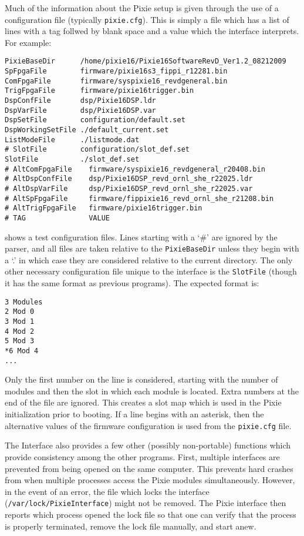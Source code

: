 \documentclass[10pt]{article}
\begin{document}
Much of the information about the Pixie setup is given through the use of a configuration file (typically \texttt{pixie.cfg}). This is simply a file which has a list of lines with a tag follwed by blank space and a value which the interface interprets. For example:
\begin{verbatim}
PixieBaseDir      /home/pixie16/Pixie16SoftwareRevD_Ver1.2_08212009
SpFpgaFile        firmware/pixie16s3_fippi_r12281.bin
ComFpgaFile       firmware/syspixie16_revdgeneral.bin
TrigFpgaFile      firmware/pixie16trigger.bin
DspConfFile       dsp/Pixie16DSP.ldr
DspVarFile        dsp/Pixie16DSP.var
DspSetFile        configuration/default.set
DspWorkingSetFile ./default_current.set
ListModeFile      ./listmode.dat
# SlotFile        configuration/slot_def.set
SlotFile          ./slot_def.set
# AltComFpgaFile    firmware/syspixie16_revdgeneral_r20408.bin
# AltDspConfFile    dsp/Pixie16DSP_revd_ornl_she_r22025.ldr
# AltDspVarFile     dsp/Pixie16DSP_revd_ornl_she_r22025.var
# AltSpFpgaFile     firmware/fippixie16_revd_ornl_she_r21208.bin
# AltTrigFpgaFile   firmware/pixie16trigger.bin
# TAG               VALUE

\end{verbatim}
shows a test configuration files. Lines starting with a `\#' are ignored by the parser, and all files are taken relative to the \texttt{PixieBaseDir} unless they begin with a `.' in which case they are considered relative to the current directory. The only other necessary configuration file unique to the interface is the \texttt{SlotFile} (though it has the same format as previous programs). The expected format is:
\begin{verbatim}
3 Modules
2 Mod 0 
3 Mod 1
4 Mod 2
5 Mod 3
*6 Mod 4
...
\end{verbatim}
Only the first number on the line is considered, starting with the number of
modules and then the slot in which each module is located. Extra numbers at
the end of the file are ignored. This creates a slot map which is used in the
Pixie initialization prior to booting. If a line begins with an asterisk, then
the alternative values of the firmware configuration is used from the
\texttt{pixie.cfg} file.

The Interface also provides a few other (possibly non-portable) functions which provide consistency among the other programs. First, multiple interfaces are prevented from being opened on the same computer. This prevents hard crashes from when multiple processes access the Pixie modules simultaneously. However, in the event of an error, the file which locks the interface (\texttt{/var/lock/PixieInterface}) might not be removed. The Pixie interface then reports which process opened the lock file so that one can verify that the process is properly terminated, remove the lock file manually, and start anew.
\end{document}

